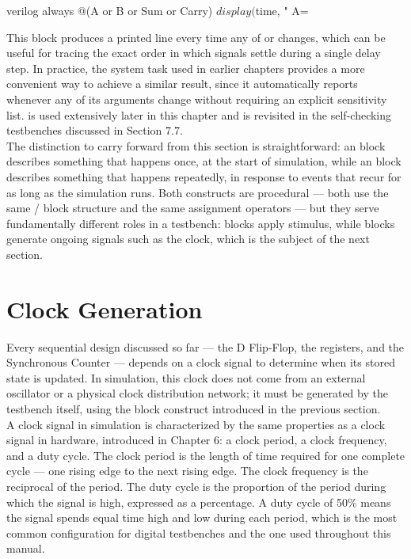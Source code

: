 \begin{codeblock}{verilog}
always @(A or B or Sum or Carry)
    $display($time, " A=%
\end{codeblock}

This block produces a printed line every time any of  or  changes, which can be useful for tracing the exact order in which signals settle during a single delay step. In practice, the  system task used in earlier chapters provides a more convenient way to achieve a similar result, since it automatically reports whenever any of its arguments change without requiring an explicit sensitivity list.  is used extensively later in this chapter and is revisited in the self-checking testbenches discussed in Section 7.7. \\

\noindent The distinction to carry forward from this section is straightforward: an  block describes something that happens once, at the start of simulation, while an  block describes something that happens repeatedly, in response to events that recur for as long as the simulation runs. Both constructs are procedural — both use the same / block structure and the same assignment operators — but they serve fundamentally different roles in a testbench:  blocks apply stimulus, while  blocks generate ongoing signals such as the clock, which is the subject of the next section. \\


\section{Clock Generation}
Every sequential design discussed so far — the D Flip-Flop, the registers, and the Synchronous Counter — depends on a clock signal to determine when its stored state is updated. In simulation, this clock does not come from an external oscillator or a physical clock distribution network; it must be generated by the testbench itself, using the  block construct introduced in the previous section. \\


\noindent A clock signal in simulation is characterized by the same properties as a clock signal in hardware, introduced in Chapter 6: a clock period, a clock frequency, and a duty cycle. The clock period is the length of time required for one complete cycle — one rising edge to the next rising edge. The clock frequency is the reciprocal of the period. The duty cycle is the proportion of the period during which the signal is high, expressed as a percentage. A duty cycle of 50\% means the signal spends equal time high and low during each period, which is the most common configuration for digital testbenches and the one used throughout this manual.\\


